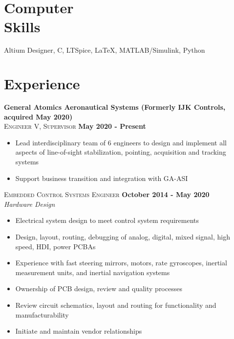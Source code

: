 \documentclass[margin,line]{resume}
\begin{document}
\begin{resume}
    \section{\mysidestyle Computer\\ Skills}

    Altium Designer, C, LTSpice, \LaTeX , MATLAB/Simulink, Python


    \section{\mysidestyle Experience}
    
    \textbf{General Atomics Aeronautical Systems (Formerly IJK Controls, acquired May 2020)}\\
    \textsc{Engineer V, Supervisor} \hfill \textbf{May 2020 - Present}\\ \vspace{-4mm}
    \begin{itemize} \itemsep -2pt
    		\item Lead interdisciplinary team of 6 engineers to design and implement all aspects of line-of-sight stabilization, pointing, acquisition and tracking systems
    		\item Support business transition and integration with GA-ASI
    	\end{itemize} \vspace{-2.25mm}
    	
    \textsc{Embedded Control Systems Engineer} \hfill \textbf{October 2014 - May 2020}\\ \vspace{-4mm}
    \textsl{Hardware Design}\\
    \begin{itemize} \itemsep -2pt
    		\item Electrical system design to meet control system requirements
        \item Design, layout, routing, debugging of analog, digital, mixed signal, high speed, HDI, power PCBAs
        \item Experience with fast steering mirrors, motors, rate gyroscopes, inertial measurement units, and inertial navigation systems
        \item Ownership of PCB design, review and quality processes
        \item Review circuit schematics, layout and routing for functionality and manufacturability
        \item Initiate and maintain vendor relationships
     \end{itemize}\vspace{-4mm}
     

\end{resume}
\end{document}
